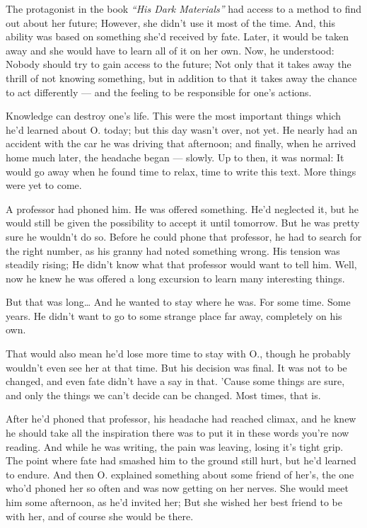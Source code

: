 The protagonist in the book \emph{\enquote{His Dark Materials}} had access to a method to find out about her future; However, she didn't use it most of the time. 
And, this ability was based on something she'd received by fate. Later, it would be taken away and she would have to learn all of it on her own. 
Now, he understood: Nobody should try to gain access to the future; Not only that it takes away the thrill of not knowing something, but in addition to that it takes away the chance to act differently --- and the feeling to be responsible for one's actions.

Knowledge can destroy one's life. 
This were the most important things which he'd learned about O. today; but this day wasn't over, not yet. 
He nearly had an accident with the car he was driving that afternoon; and finally, when he arrived home much later, the headache began --- slowly. 
Up to then, it was normal: It would go away when he found time to relax, time to write this text. 
More things were yet to come.

A professor had phoned him. 
He was offered something. 
He'd neglected it, but he would still be given the possibility to accept it until tomorrow. 
But he was pretty sure he wouldn't do so. 
Before he could phone that professor, he had to search for the right number, as his granny had noted something wrong. 
His tension was steadily rising; He didn't know what that professor would want to tell him. 
Well, now he knew he was offered a long excursion to learn many interesting things.

But that was long\ldots
And he wanted to stay where he was. 
For some time. 
Some years. 
He didn't want to go to some strange place far away, completely on his own.

That would also mean he'd lose more time to stay with O., though he probably wouldn't even see her at that time. 
But his decision was final. 
It was not to be changed, and even fate didn't have a say in that.
'Cause some things are sure, and only the things we can't decide can be changed. 
Most times, that is.

After he'd phoned that professor, his headache had reached climax, and he knew he should take all the inspiration there was to put it in these words you're now reading. 
And while he was writing, the pain was leaving, losing it's tight grip.
The point where fate had smashed him to the ground still hurt, but he'd learned to endure. 
And then O. explained something about some friend of her's, the one who'd phoned her so often and was now getting on her nerves. 
She would meet him some afternoon, as he'd invited her; But she wished her best friend to be with her, and of course she would be there.

